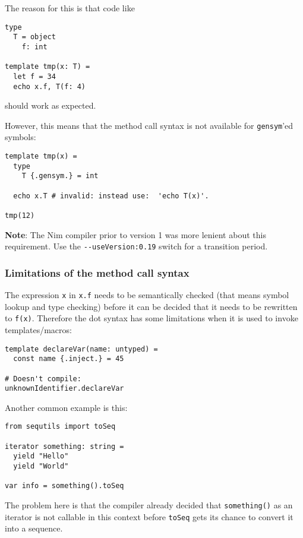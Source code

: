 The reason for this is that code like

\begin{verbatim}
type
  T = object
    f: int

template tmp(x: T) =
  let f = 34
  echo x.f, T(f: 4)
\end{verbatim}

should work as expected.

However, this means that the method call syntax is not available for
\texttt{gensym}'ed symbols:

\begin{verbatim}
template tmp(x) =
  type
    T {.gensym.} = int

  echo x.T # invalid: instead use:  'echo T(x)'.

tmp(12)
\end{verbatim}

\textbf{Note}: The Nim compiler prior to version 1 was more lenient
about this requirement. Use the \texttt{-\/-useVersion:0.19} switch for
a transition period.

\hypertarget{limitations-of-the-method-call-syntax}{%
\subsubsection{Limitations of the method call
syntax}\label{limitations-of-the-method-call-syntax}}

The expression \texttt{x} in \texttt{x.f} needs to be semantically
checked (that means symbol lookup and type checking) before it can be
decided that it needs to be rewritten to \texttt{f(x)}. Therefore the
dot syntax has some limitations when it is used to invoke
templates/macros:

\begin{verbatim}
template declareVar(name: untyped) =
  const name {.inject.} = 45

# Doesn't compile:
unknownIdentifier.declareVar
\end{verbatim}

Another common example is this:

\begin{verbatim}
from sequtils import toSeq

iterator something: string =
  yield "Hello"
  yield "World"

var info = something().toSeq
\end{verbatim}

The problem here is that the compiler already decided that
\texttt{something()} as an iterator is not callable in this context
before \texttt{toSeq} gets its chance to convert it into a sequence.

